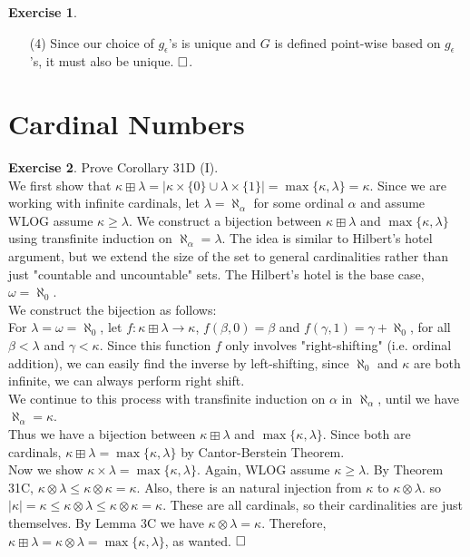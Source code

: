 \documentclass{article}
\theoremstyle{definition}
\newtheorem{exercise}{Exercise}[section]
\newcommand{\so}{\text{\textbf{Solution: }}}
\newcommand{\es}{$\hfill \square$}
\begin{document}
\begin{exercise}
\begin{itemize}
            \item[(4)] Since our choice of $g_\epsilon$'s is unique and $G$ is defined point-wise based on $g_\epsilon$'s, it must also be unique. \es.
        \end{itemize}
    \end{exercise}
\section{Cardinal Numbers}
    \begin{exercise}
        Prove Corollary 31D (I).\vspace{1em}\\
        \so We first show that $\kappa \boxplus \lambda = |\kappa \times \{0\} \cup \lambda \times \{1\}| = \max\{\kappa, \lambda\} = \kappa$. Since we are working with infinite cardinals, let $\lambda = \aleph_\alpha$ for some ordinal $\alpha$ and assume WLOG assume $\kappa \geq \lambda$. We construct a bijection between $\kappa \boxplus \lambda$ and $ \max\{\kappa, \lambda\}$ using transfinite induction on $\aleph_\alpha = \lambda$. The idea is similar to Hilbert's hotel argument, but we extend the size of the set to general cardinalities rather than just "countable and uncountable" sets. The Hilbert's hotel is the base case, $\omega = \aleph_0$.\vspace{1em}\\
        We construct the bijection as follows: \\
        For $\lambda = \omega = \aleph_0$, let $f: \kappa \boxplus \lambda \rightarrow \kappa$, $f(\beta, 0) = \beta$ and $f(\gamma, 1) = \gamma + \aleph_0 $, for all $\beta < \lambda$ and $\gamma < \kappa$. Since this function $f$ only involves "right-shifting" (i.e. ordinal addition), we can easily find the inverse by left-shifting, since $\aleph_0$ and $\kappa$ are both infinite, we can always perform right shift. \\
        We continue to this process with transfinite induction on $\alpha$ in $\aleph_\alpha$, until we have $\aleph_\alpha = \kappa$.\vspace{1em}\\
        Thus we have a bijection between $\kappa \boxplus \lambda$ and $\max\{\kappa, \lambda\}$. Since both are cardinals, $\kappa \boxplus \lambda = \max\{\kappa, \lambda\}$ by Cantor-Berstein Theorem.
        $$$$
        Now we show $\kappa \times \lambda = \max\{\kappa, \lambda\}$. Again, WLOG assume $\kappa \geq \lambda$. By Theorem 31C, $\kappa \otimes \lambda \leq \kappa \otimes \kappa = \kappa$. Also, there is an natural injection from $\kappa$ to $\kappa \otimes \lambda$. so $|\kappa| = \kappa \leq \kappa \otimes \lambda \leq \kappa \otimes \kappa = \kappa$. These are all cardinals, so their cardinalities are just themselves. By Lemma 3C we have $\kappa \otimes \lambda = \kappa$. Therefore, $\kappa \boxplus \lambda = \kappa \otimes \lambda = \max\{\kappa, \lambda\}$, as wanted. \es
    \end{exercise}
\end{document}
